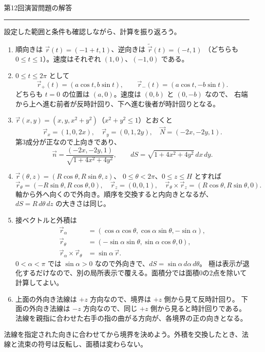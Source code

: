 \documentclass[a4paper,10pt,pdflatex,ja=standard,jafont=ipaex-type1,
  magstyle=real,scale=1]{bxjsarticle}
\newcommand{\handouttitle}[1]{%
  \begin{center}
    {\Large\color{ink}#1}\par\vspace{3mm}
    {\color{accent}\rule{0.88\linewidth}{0.7pt}}
  \end{center}\vspace{-2mm}}
\newcommand{\keybox}[1]{\par\vspace{3pt}\begingroup
  \setlength{\fboxsep}{4pt}%
  \colorbox{soft}{\parbox{\dimexpr\linewidth-2\fboxsep\relax}{\small #1}}%
  \endgroup\par\vspace{2pt}}
\newenvironment{problems}
  {\begin{enumerate}[leftmargin=2em,itemsep=3pt,topsep=3pt,parsep=0pt,
    font=\color{accent}]}
  {\end{enumerate}}
\begin{document}
\newpage
\handouttitle{第12回\quad 演習問題の解答}
{\small 設定した範囲と条件も確認しながら、計算を振り返ろう。}\par
\begin{problems}
\setlength{\itemsep}{7pt}
\item 順向きは $\vec r(t)=(-1+t,1)$、逆向きは $\widetilde{\vec r}(t)=(-t,1)$
（どちらも $0\le t\le1$）。速度はそれぞれ $(1,0)$、$(-1,0)$ である。

\item $0\le t\le2\pi$ として
$$
 \vec r_+(t)=(a\cos t,b\sin t),\qquad
 \vec r_-(t)=(a\cos t,-b\sin t).
$$
どちらも $t=0$ の位置は $(a,0)$。速度は $(0,b)$ と $(0,-b)$ なので、
右端から上へ進む前者が反時計回り、下へ進む後者が時計回りとなる。

\item $\vec r(x,y)=(x,y,x^2+y^2)$（$x^2+y^2\le1$）とおくと
$$
 \vec r_x=(1,0,2x),\quad \vec r_y=(0,1,2y),\quad
 \vec N=(-2x,-2y,1).
$$
第3成分が正なので上向きであり、
$$
 \vec n=\frac{(-2x,-2y,1)}{\sqrt{1+4x^2+4y^2}},\qquad
 dS=\sqrt{1+4x^2+4y^2}\,dx\,dy.
$$

\item $\vec r(\theta,z)=(R\cos\theta,R\sin\theta,z)$、
$0\le\theta<2\pi$、$0\le z\le H$ とすれば
$$
 \vec r_\theta=(-R\sin\theta,R\cos\theta,0),\quad \vec r_z=(0,0,1),\quad
 \vec r_\theta\times\vec r_z=(R\cos\theta,R\sin\theta,0).
$$
軸から外へ向くので外向き。順序を交換すると内向きとなるが、$dS=R\,d\theta\,dz$ の大きさは同じ。

\item 接ベクトルと外積は
$$
 \begin{aligned}
 \vec r_\alpha&=(\cos\alpha\cos\theta,\cos\alpha\sin\theta,-\sin\alpha),\\
 \vec r_\theta&=(-\sin\alpha\sin\theta,\sin\alpha\cos\theta,0),\\
 \vec r_\alpha\times\vec r_\theta&=\sin\alpha\,\vec r.
 \end{aligned}
$$
$0<\alpha<\pi$ では $\sin\alpha>0$ なので外向きで、$dS=\sin\alpha\,d\alpha\,d\theta$。
極は表示が退化するだけなので、別の局所表示で覆える。面積分では面積0の2点を除いて計算してよい。

\item 上面の外向き法線は $+z$ 方向なので、境界は $+z$ 側から見て反時計回り。
下面の外向き法線は $-z$ 方向なので、同じ $+z$ 側から見ると時計回りである。
法線を親指に合わせた右手の指の曲がる方向が、各境界の正の向きとなる。
\end{problems}
\keybox{法線を指定された向きに合わせてから境界を決めよう。外積を交換したとき、法線と流束の符号は反転し、面積は変わらない。}
\end{document}
